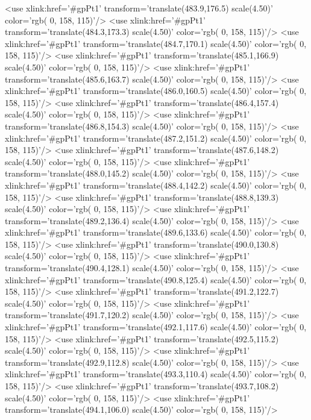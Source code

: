 	<use xlink:href='#gpPt1' transform='translate(483.9,176.5) scale(4.50)' color='rgb(  0, 158, 115)'/>
	<use xlink:href='#gpPt1' transform='translate(484.3,173.3) scale(4.50)' color='rgb(  0, 158, 115)'/>
	<use xlink:href='#gpPt1' transform='translate(484.7,170.1) scale(4.50)' color='rgb(  0, 158, 115)'/>
	<use xlink:href='#gpPt1' transform='translate(485.1,166.9) scale(4.50)' color='rgb(  0, 158, 115)'/>
	<use xlink:href='#gpPt1' transform='translate(485.6,163.7) scale(4.50)' color='rgb(  0, 158, 115)'/>
	<use xlink:href='#gpPt1' transform='translate(486.0,160.5) scale(4.50)' color='rgb(  0, 158, 115)'/>
	<use xlink:href='#gpPt1' transform='translate(486.4,157.4) scale(4.50)' color='rgb(  0, 158, 115)'/>
	<use xlink:href='#gpPt1' transform='translate(486.8,154.3) scale(4.50)' color='rgb(  0, 158, 115)'/>
	<use xlink:href='#gpPt1' transform='translate(487.2,151.2) scale(4.50)' color='rgb(  0, 158, 115)'/>
	<use xlink:href='#gpPt1' transform='translate(487.6,148.2) scale(4.50)' color='rgb(  0, 158, 115)'/>
	<use xlink:href='#gpPt1' transform='translate(488.0,145.2) scale(4.50)' color='rgb(  0, 158, 115)'/>
	<use xlink:href='#gpPt1' transform='translate(488.4,142.2) scale(4.50)' color='rgb(  0, 158, 115)'/>
	<use xlink:href='#gpPt1' transform='translate(488.8,139.3) scale(4.50)' color='rgb(  0, 158, 115)'/>
	<use xlink:href='#gpPt1' transform='translate(489.2,136.4) scale(4.50)' color='rgb(  0, 158, 115)'/>
	<use xlink:href='#gpPt1' transform='translate(489.6,133.6) scale(4.50)' color='rgb(  0, 158, 115)'/>
	<use xlink:href='#gpPt1' transform='translate(490.0,130.8) scale(4.50)' color='rgb(  0, 158, 115)'/>
	<use xlink:href='#gpPt1' transform='translate(490.4,128.1) scale(4.50)' color='rgb(  0, 158, 115)'/>
	<use xlink:href='#gpPt1' transform='translate(490.8,125.4) scale(4.50)' color='rgb(  0, 158, 115)'/>
	<use xlink:href='#gpPt1' transform='translate(491.2,122.7) scale(4.50)' color='rgb(  0, 158, 115)'/>
	<use xlink:href='#gpPt1' transform='translate(491.7,120.2) scale(4.50)' color='rgb(  0, 158, 115)'/>
	<use xlink:href='#gpPt1' transform='translate(492.1,117.6) scale(4.50)' color='rgb(  0, 158, 115)'/>
	<use xlink:href='#gpPt1' transform='translate(492.5,115.2) scale(4.50)' color='rgb(  0, 158, 115)'/>
	<use xlink:href='#gpPt1' transform='translate(492.9,112.8) scale(4.50)' color='rgb(  0, 158, 115)'/>
	<use xlink:href='#gpPt1' transform='translate(493.3,110.4) scale(4.50)' color='rgb(  0, 158, 115)'/>
	<use xlink:href='#gpPt1' transform='translate(493.7,108.2) scale(4.50)' color='rgb(  0, 158, 115)'/>
	<use xlink:href='#gpPt1' transform='translate(494.1,106.0) scale(4.50)' color='rgb(  0, 158, 115)'/>
